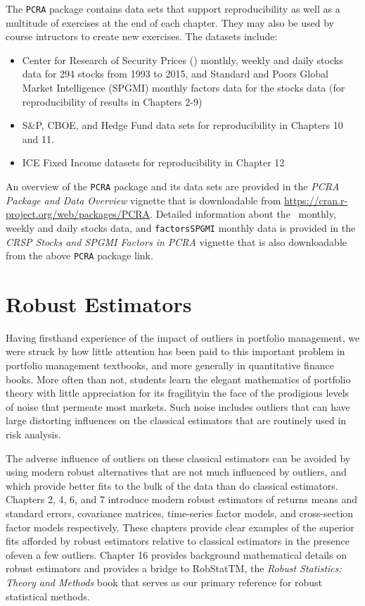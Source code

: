 \documentclass[graybox,envcountchap,sectrefs]{svmono}\usepackage[]{graphicx}\usepackage[]{xcolor}
\begin{document}
The \texttt{PCRA} package contains data sets that support reproducibility
as well as a multitude of exercises at the end of each chapter. They
may also be used by course intructors to create new exercises. The
datasets include:
\begin{itemize}
\item Center for Research of Security Prices (\CRSPTM) monthly, weekly
and daily stocks data for 294 stocks from 1993 to 2015, and Standard
and Poors Global Market Intelligence (SPGMI) monthly factors data
for the \CRSPTM stocks data (for reproducibility of results in Chapters
2-9)
\item S\&P, CBOE, and Hedge Fund data sets for reproducibility in Chapters
10 and 11.
\item ICE Fixed Income datasets for reproducibility in Chapter 12
\end{itemize}
An overview of the \texttt{PCRA} package and its data sets are provided
in the \emph{PCRA Package and Data Overview} vignette that is downloadable
from \url{https://cran.r-project.org/web/packages/PCRA}. Detailed
information about the \CRSPTM\ monthly, weekly and daily stocks
data, and \texttt{factorsSPGMI} monthly data is provided in the \emph{CRSP
Stocks and SPGMI Factors in PCRA} vignette that is also downloadable
from the above \texttt{PCRA} package link.

\section*{Robust Estimators}

Having firsthand experience of the impact of outliers in portfolio
management, we were struck by how little attention has been paid to
this important problem in portfolio management textbooks, and more
generally in quantitative finance books. More often than not, students
learn the elegant mathematics of portfolio theory with little appreciation
for its fragilityin the face of the prodigious levels of noise that
permeate most markets. Such noise includes outliers that can have
large distorting influences on the classical estimators that are routinely
used in risk analysis.

The adverse influence of outliers on these classical estimators can
be avoided by using modern robust alternatives that are not much influenced
by outliers, and which provide better fits to the bulk of the data
than do classical estimators. Chapters 2, 4, 6, and 7 introduce modern
robust estimators of returns means and standard errors, covariance
matrices, time-series factor models, and cross-section factor models
respectively. These chapters provide clear examples of the superior
fits afforded by robust estimators relative to classical estimators
in the presence ofeven a few outliers. Chapter 16 provides background
mathematical details on robust estimators and provides a bridge to
RobStatTM, the \citet{Maronna2019} \emph{Robust Statistics: Theory
and Methods} book that serves as our primary reference for robust
statistical methods.
\end{document}
